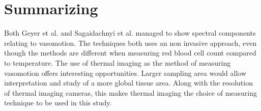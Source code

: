   
\section{Summarizing}

Both Geyer et al. and Sagaidachnyi et al. managed to show spectral components relating to vasomotion. The techniques both uses an non invasive approach, even though the methods are different when measuring red blood cell count compared to temperature. The use of thermal imaging as the method of measuring vasomotion offers interesting opportunities. Larger sampling area would allow interpretation and study of a more global tissue area. Along with the resolution of thermal imaging cameras, this makes thermal imaging the choice of measuring technique to be used in this study. 



